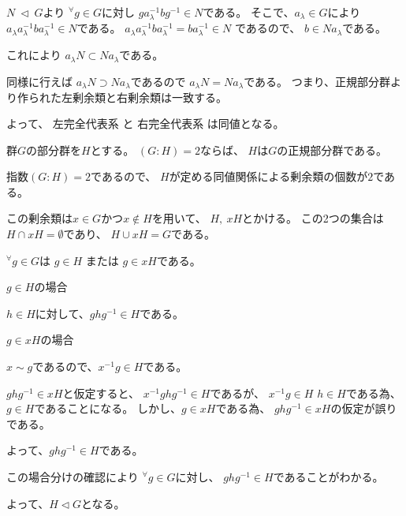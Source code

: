 \documentclass[12pt,b5paper]{ltjsarticle}
\begin{document}
$N \: \triangleleft \: G$より
${}^{\forall}g\in G$に対し
$ga_{\lambda}^{-1}bg^{-1} \in N$である。
そこで、$a_{\lambda}\in G$により
$a_{\lambda}a_{\lambda}^{-1}ba_{\lambda}^{-1} \in N$である。
$a_{\lambda}a_{\lambda}^{-1}ba_{\lambda}^{-1} =ba_{\lambda}^{-1} \in N$
であるので、
$b\in Na_{\lambda}$である。

これにより
$a_{\lambda}N \subset Na_{\lambda}$である。


同様に行えば
$a_{\lambda}N \supset Na_{\lambda}$であるので
$a_{\lambda}N = Na_{\lambda}$である。
つまり、正規部分群より作られた左剰余類と右剰余類は一致する。

よって、
左完全代表系
と
右完全代表系
は同値となる。












\hrulefill

群$G$の部分群を$H$とする。
$(G:H)=2$ならば、
$H$は$G$の正規部分群である。

\dotfill

指数$(G:H)=2$であるので、
$H$が定める同値関係による剰余類の個数が$2$である。

この剰余類は$x\in G$かつ$x\not\in H$を用いて、
$H,\ xH$とかける。
この2つの集合は$H \cap xH = \emptyset$であり、
$H \cup xH = G$である。

${}^{\forall}g\in G$は
$g\in H$ または $g\in xH$である。

$g\in H$の場合

$h\in H$に対して、$ghg^{-1} \in H$である。


$g\in xH$の場合

$x\sim g$であるので、$x^{-1}g\in H$である。

$ghg^{-1}\in xH$と仮定すると、
$x^{-1}ghg^{-1}\in H$であるが、
$x^{-1}g\in H$
$h\in H$である為、$g\in H$であることになる。
しかし、$g\in xH$である為、
$ghg^{-1}\in xH$の仮定が誤りである。

よって、$ghg^{-1}\in H$である。


この場合分けの確認により
${}^{\forall}g\in G$に対し、
$ghg^{-1}\in H$であることがわかる。

よって、$H \triangleleft G$となる。
\end{document}
